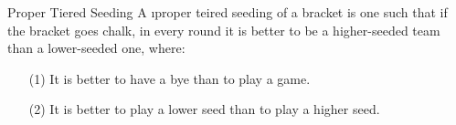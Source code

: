 {    \begin{definition}{Proper Tiered Seeding}{}
        A \i{proper teired seeding} of a bracket is one such that if the bracket goes chalk, in every round it is better to be a higher-seeded team than a lower-seeded one, where: \begin{itemize}
            \item[(1)] It is better to have a bye than to play a game.
            \item[(2)] It is better to play a lower seed than to play a higher seed.
        \end{itemize}
    \end{definition}















}